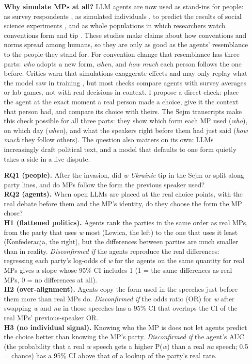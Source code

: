 \documentclass[10pt,twocolumn]{article}
\begin{document}
\textbf{Why simulate MPs at all?} LLM agents are now used as stand-ins for people: as survey respondents \citep{argyle2023}, as simulated individuals \citep{park2024}, to predict the results of social science experiments \citep{ashokkumar2026}, and as whole populations in which researchers watch conventions form and tip \citep{ashery2025,flint2026}. These studies make claims about how conventions and norms spread among humans, so they are only as good as the agents' resemblance to the people they stand for. For convention change that resemblance has three parts: \emph{who} adopts a new form, \emph{when}, and \emph{how much} each person follows the one before. Critics warn that simulations exaggerate effects \citep{ashokkumar2026,feroz2026} and may only replay what the model saw in training \citep{barrie2025}, but most checks compare agents with survey averages or lab games, not with real decisions in context. I propose a direct check: place the agent at the exact moment a real person made a choice, give it the context that person had, and compare its choice with theirs. The Sejm transcripts make this check possible for all three parts: they show which form each MP used (\emph{who}), on which day (\emph{when}), and what the speakers right before them had just said (\emph{how much} they follow others). The question also matters on its own: LLMs increasingly draft political text, and a model that defaults to one form quietly takes a side in a live dispute.

\begin{hypbox}
\textbf{RQ1 (people).} After the invasion, did \emph{w Ukrainie} tip in the Sejm or split along party lines, and do MPs follow the form the previous speaker used?\\[2pt]
\textbf{RQ2 (agents).} When open LLMs are placed at the real choice points, with the real debate before them and the MP's identity, do they choose the form the MP chose?\\[2pt]
\textbf{H1 (flattened politics).} Agents rank the parties in the same order as real MPs, from the party that uses \emph{w} most (Lewica, the left) to the one that uses it least (Konfederacja, the right), but the differences between parties are much smaller than in reality. \emph{Disconfirmed if} the agents reproduce the real differences: regressing each party's log-odds of \emph{w} for the agents on the same quantity for real MPs gives a slope whose 95\% CI includes 1 (1 = the same differences as real MPs, 0 = no differences at all).\\[2pt]
\textbf{H2 (over-alignment).} Agents copy the form used in the speeches just before them more than real MPs do. \emph{Disconfirmed if} the odds ratio (OR) for \emph{w} after swapping \emph{w} and \emph{na} in those speeches has a 95\% CI that overlaps the CI of the real MPs' previous-speaker OR.\\[2pt]
\textbf{H3 (no individual signal).} Knowing who the MP is does not let agents predict the choice better than knowing the MP's party. \emph{Disconfirmed if} the agent's AUC (the probability that a real \emph{w} speech gets a higher P(\emph{w}) than a real \emph{na} speech; 0.5 = chance) has a 95\% CI above that of a lookup of the party's real rate.
\end{hypbox}
\end{document}
